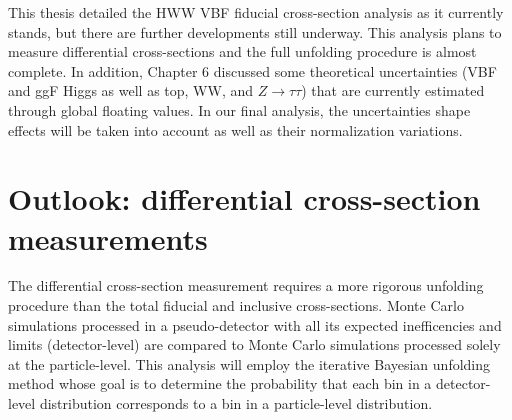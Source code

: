 This thesis detailed the HWW VBF fiducial cross-section analysis as it currently stands, but there are further developments still underway. This analysis plans to measure differential cross-sections and the full unfolding procedure is almost complete. In addition, Chapter 6 discussed some theoretical uncertainties (VBF and ggF Higgs as well as top, WW, and $Z\rightarrow \tau\tau$) that are currently estimated through global floating values. In our final analysis, the uncertainties shape effects will be taken into account as well as their normalization variations.

\section{Outlook: differential cross-section measurements}
The differential cross-section measurement requires a more rigorous unfolding procedure than the total fiducial and inclusive cross-sections. Monte Carlo simulations processed in a pseudo-detector with all its expected inefficencies and limits (detector-level) are compared to Monte Carlo simulations processed solely at the particle-level. This analysis will employ the iterative Bayesian unfolding method \cite{bayesian} whose goal is to determine the probability that each bin in a detector-level distribution corresponds to a bin in a particle-level distribution. 
